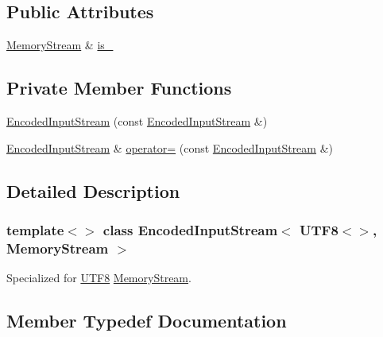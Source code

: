 \subsection*{Public Attributes}
\begin{DoxyCompactItemize}
\item 
\hyperlink{structMemoryStream}{Memory\+Stream} \& \hyperlink{classEncodedInputStream_3_01UTF8_3_4_00_01MemoryStream_01_4_ad5e48564bbd14297a4cc445af3a4aa83}{is\+\_\+}
\end{DoxyCompactItemize}
\subsection*{Private Member Functions}
\begin{DoxyCompactItemize}
\item 
\hyperlink{classEncodedInputStream_3_01UTF8_3_4_00_01MemoryStream_01_4_ad46d0944fcff4ae72790e956d8a57fa2}{Encoded\+Input\+Stream} (const \hyperlink{classEncodedInputStream}{Encoded\+Input\+Stream} \&)
\item 
\hyperlink{classEncodedInputStream}{Encoded\+Input\+Stream} \& \hyperlink{classEncodedInputStream_3_01UTF8_3_4_00_01MemoryStream_01_4_a7c89eb320966f9a82027149eede0c8e9}{operator=} (const \hyperlink{classEncodedInputStream}{Encoded\+Input\+Stream} \&)
\end{DoxyCompactItemize}


\subsection{Detailed Description}
\subsubsection*{template$<$$>$\newline
class Encoded\+Input\+Stream$<$ U\+T\+F8$<$$>$, Memory\+Stream $>$}

Specialized for \hyperlink{structUTF8}{U\+T\+F8} \hyperlink{structMemoryStream}{Memory\+Stream}. 

\subsection{Member Typedef Documentation}
\mbox{\label{classEncodedInputStream_3_01UTF8_3_4_00_01MemoryStream_01_4_a091eb31dd2554bf10054148953f9b3bf}} 
